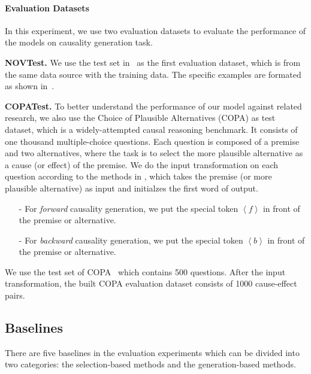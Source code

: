 \paragraph{Evaluation Datasets}
\label{sec:causalgen-eval-dataset}
In this experiment, 
we use two evaluation datasets to evaluate the performance of the models on causality generation task.

\textbf{NOVTest.}
We use the test set in~ as the first evaluation dataset,
which is from the same data source with the training data.
The specific examples are formated as shown in~. 

\textbf{COPATest.}
To better understand the performance of our model against related research, we also use 
the Choice of Plausible Alternatives (COPA) 
as test dataset, which is a widely-attempted causal reasoning benchmark. 
It consists of one thousand multiple-choice questions.
Each question is composed of a premise and two alternatives,
where the task is to select the more plausible alternative as a cause (or effect) of the premise. 
We do the input transformation on each question according to the methods in , 
which takes the premise (or more plausible alternative) as input and initialzes the first word of output.
\begin{itemize}
\item[-] For \textit{forward} causality generation, 
      we put the special token $\left< f\right>$ in front of the premise or alternative.
\item[-] For \textit{backward} causality generation, 
      we put the special token $\left< b\right>$ in front of the premise or alternative.
\end{itemize}
We use the test set of COPA~\cite{gordon2011commonsense}
which contains 500 questions.
After the input transformation,
the built COPA evaluation dataset consists of 1000 cause-effect pairs. 

\subsection{Baselines}
\label{sec:causalgen-baselines}
There are five baselines in the evaluation experiments
which can be divided into two categories:
the selection-based methods and the generation-based methods. 

